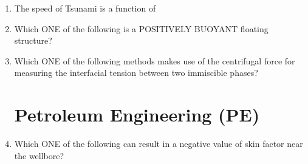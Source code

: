 \documentclass[journal,12pt,onecolumn]{IEEEtran}
\theoremstyle{remark}
\begin{document}
\begin{enumerate}
\item  The speed of Tsunami is a function of
\begin{enumerate}
\end{enumerate}
\hfill{}



\item  Which ONE of the following is a POSITIVELY BUOYANT floating structure?
\begin{enumerate}
\end{enumerate}
\hfill{}



\item  Which ONE of the following methods makes use of the centrifugal force for measuring the interfacial tension between two immiscible phases?
\begin{enumerate}
\end{enumerate}
\hfill{}



\section*{Petroleum Engineering (PE)}
 \item Which ONE of the following can result in a negative value of skin factor near the wellbore?
\begin{enumerate}
\end{enumerate}
\hfill{}




\end{enumerate}
\end{document}

